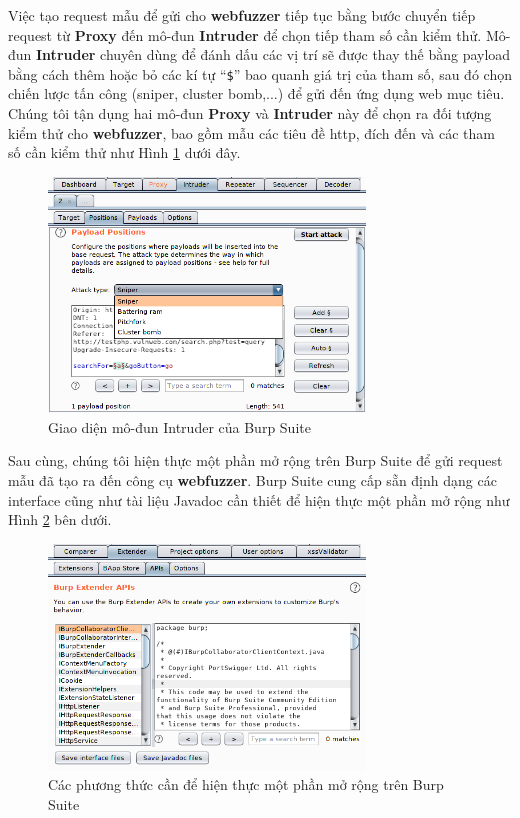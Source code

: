 Việc tạo request mẫu để gửi cho \textbf{webfuzzer} tiếp tục bằng bước chuyển tiếp request từ \textbf{Proxy} đến mô-đun \textbf{Intruder} để chọn tiếp tham số cần kiểm thử. Mô-đun \textbf{Intruder} chuyên dùng để đánh dấu các vị trí sẽ được thay thế bằng payload bằng cách thêm hoặc bỏ các kí tự ``\texttt{\$}'' bao quanh giá trị của tham số, sau đó chọn chiến lược tấn công (sniper, cluster bomb,...) để gửi đến ứng dụng web mục tiêu. Chúng tôi tận dụng hai mô-đun \textbf{Proxy} và \textbf{Intruder} này để chọn ra đối tượng kiểm thử cho \textbf{webfuzzer}, bao gồm mẫu các tiêu đề \acrshort{http}, đích đến và các tham số cần kiểm thử như Hình \ref{fig:burp-intruder} dưới đây.
\begin{figure}[H]
  \centering
    \includegraphics[width=0.75\textwidth,keepaspectratio=true]{images/burp-intruder.png}
  \caption{Giao diện mô-đun Intruder của Burp Suite}
  \label{fig:burp-intruder}
\end{figure}
Sau cùng, chúng tôi hiện thực một phần mở rộng trên Burp Suite để gửi request mẫu đã tạo ra đến công cụ \textbf{webfuzzer}. Burp Suite cung cấp sẵn định dạng các interface cũng như tài liệu Javadoc cần thiết để hiện thực một phần mở rộng như Hình \ref{fig:burp-extender} bên dưới.
\begin{figure}[H]
  \centering
    \includegraphics[width=0.75\textwidth,keepaspectratio=true]{images/burp-extender.png}
  \caption{Các phương thức cần để hiện thực một phần mở rộng trên Burp Suite}
  \label{fig:burp-extender}
\end{figure}
